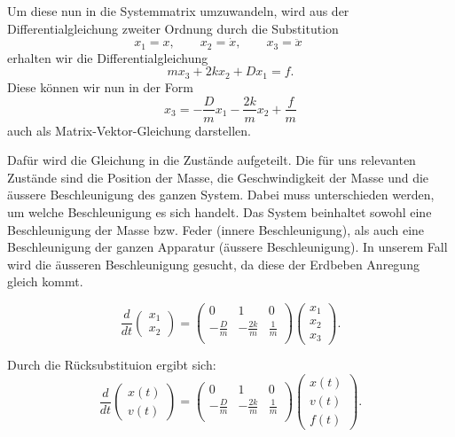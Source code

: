 Um diese nun in die Systemmatrix umzuwandeln, wird aus der Differentialgleichung zweiter Ordnung durch die Substitution 
\[ {x_1}=x, \qquad
{x_2}=\dot x,  \qquad
{x_3}=\ddot x\qquad\]
erhalten wir die Differentialgleichung
\[ m{x_3}+ 2k{x_2} + D{x_1} = f.\]
Diese können wir nun in der Form
\[ {x_3}=-\frac{D}{m} {x_1} -\frac{2k}{m} {x_2} + \frac{f} {m} \]
auch als Matrix-Vektor-Gleichung darstellen.


Dafür wird die Gleichung in die Zustände aufgeteilt. Die für uns relevanten Zustände sind die Position der Masse, die Geschwindigkeit der Masse und die äussere Beschleunigung des ganzen System. Dabei muss unterschieden werden, um welche Beschleunigung es sich handelt. Das System beinhaltet sowohl eine Beschleunigung der Masse bzw. Feder (innere Beschleunigung), als auch eine Beschleunigung der ganzen Apparatur (äussere Beschleunigung). In unserem Fall wird die äusseren Beschleunigung gesucht, da diese der Erdbeben Anregung gleich kommt. 


\begin{equation}
\frac{d}{dt} \left(\begin{array}{c} {x_1} \\ {x_2}  \end{array}\right) = \left(
 \begin{array}{ccc} 	
0 & 1& 0 \\ 
- \frac{D}{m} &-\frac{2k}{m} & \frac{1} {m}\\
\end{array}\right)  \left(\begin{array}{c} {x_1} \\ {x_2} \\ {x_3} \end{array}\right).
\end{equation}

Durch die Rücksubstituion ergibt sich:
\begin{equation}
\frac{d}{dt} \left(\begin{array}{c} x(t) \\ v(t) \end{array}\right) = \left(
 \begin{array}{ccc} 	
0 & 1& 0 \\ 
- \frac{D}{m} &-\frac{2k}{m} & \frac{1} {m}\\
\end{array}\right)  \left(\begin{array}{c} x(t)\\ v(t)\\ f(t) \end{array}\right).
\end{equation}


